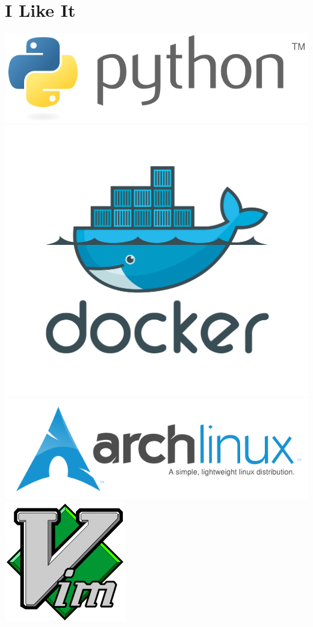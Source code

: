 \documentclass[]{friggeri-cv}
\begin{document}
\begin{aside}
~
~
~
  \section{I Like It}
    \includegraphics[scale=0.18]{img/python.png}
    \includegraphics[scale=0.18]{img/docker.png}
    \includegraphics[scale=0.18]{img/arch.png}
    \includegraphics[scale=0.06]{img/vim.png}

\end{aside}
\end{document}
